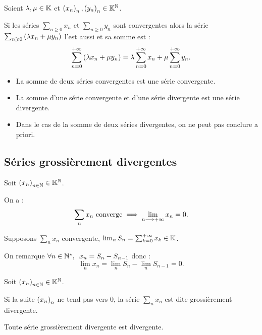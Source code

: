 \begin{prop}
Soient \(\lambda,\mu\in\mathbb{K}\) et \(\left(x_n\right)_n,\left(y_n\right)_n\in\mathbb{K}^{\mathbb{N}}\).

Si les séries \(\sum_{n\geq0}x_n\) et \(\sum_{n\geq0}y_n\) sont convergentes alors la série \(\sum_{n\geqslant0}\left(\lambda x_n+\mu y_n\right)\) l'est aussi et sa somme est : \[\sum_{n=0}^{+\infty}\left(\lambda x_n+\mu y_n\right)=\lambda\sum_{n=0}^{+\infty}x_n+\mu\sum_{n=0}^{+\infty}y_n.\]
\end{prop}

\begin{dem}
\end{dem}

\begin{rem}
\begin{itemize}
    \item La somme de deux séries convergentes est une série convergente. \\
    \item La somme d'une série convergente et d'une série divergente est une série divergente. \\
    \item Dans le cas de la somme de deux séries divergentes, on ne peut pas conclure a priori.
\end{itemize}
\end{rem}

\subsection{Séries grossièrement divergentes}

\begin{prop}
Soit \(\left(x_n\right)_{n\in\mathbb{N}}\in\mathbb{K}^{\mathbb{N}}\).

On a : \[\sum_nx_n\text{ converge}\implies\lim_{n\longrightarrow+\infty}x_n=0.\]
\end{prop}

\begin{dem}
Supposons \(\sum_nx_n\) convergente, \cad \(\lim_nS_n=\sum_{k=0}^{+\infty}x_k\in\mathbb{K}\).

On remarque \(\quantifs{\forall n\in\Ns}x_n=S_n-S_{n-1}\) donc : \[\lim_nx_n=\lim_nS_n-\lim_nS_{n-1}=0.\]
\end{dem}

\begin{defi}
Soit \(\left(x_n\right)_{n\in\mathbb{N}}\in\mathbb{K}^{\mathbb{N}}\).

Si la suite \(\left(x_n\right)_n\) ne tend pas vers \(0\), la série \(\sum_nx_n\) est dite grossièrement divergente.

Toute série grossièrement divergente est divergente.
\end{defi}

